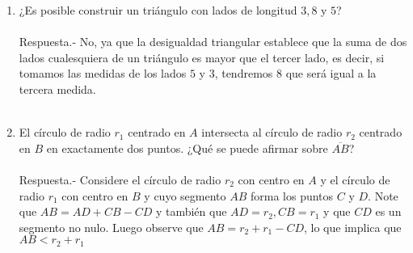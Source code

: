 \begin{enumerate}
    \item ¿Es posible construir un triángulo con lados de longitud $3,8$ y $5$?\\\\
    Respuesta.-\; No, ya que la desigualdad triangular establece que la suma de dos lados cualesquiera de un triángulo es mayor que el tercer lado, es decir, si tomamos las medidas de los lados $5$ y $3$, tendremos $8$ que será igual a la tercera medida.\\\\

    \item El círculo de radio $r_1$ centrado en $A$ intersecta al círculo de radio $r_2$ centrado en $B$ en exactamente dos puntos. ¿Qué se puede afirmar sobre $\overline{AB}$?\\\\
    Respuesta.-\; Considere el círculo de radio $r_2$ con centro en $A$ y el círculo de radio $r_1$ con centro en $B$ y cuyo segmento $AB$ forma los puntos $C$ y $D$. Note que $AB = AD + CB - CD$ y también que $AD = r_2, CB = r_1$ y que $CD$ es un segmento no nulo. Luego observe que  $AB = r_2 + r_1 - CD$, lo que implica que $AB <r_2 + r_1$\\
    \begin{center}
    \end{center}


\end{enumerate}
